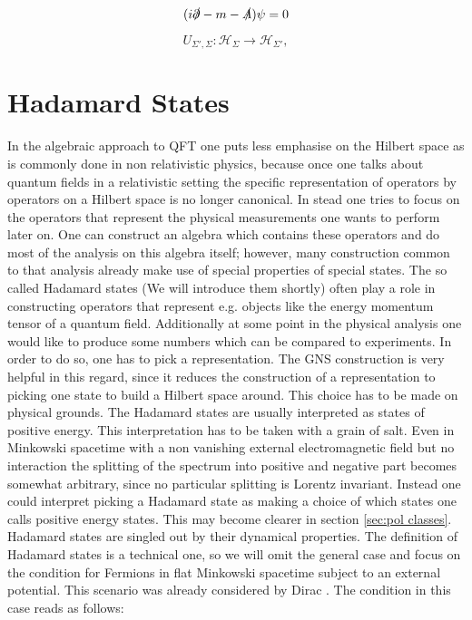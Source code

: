 \documentclass[a4paper,11pt]{article}
\begin{document}

\begin{equation}
(i\slashed{\partial} - m - \slashed{A})\psi = 0
\end{equation}

\begin{equation}
U_{\Sigma',\Sigma}:\mathcal{H}_\Sigma \rightarrow \mathcal{H}_{\Sigma'},
\end{equation}

\section{Hadamard States}
In the algebraic approach to QFT one puts less emphasise on the Hilbert space as is commonly done in non relativistic physics, because 
once one talks about quantum fields in a relativistic setting the specific representation of operators by operators on a Hilbert 
space is no longer canonical. 
In stead one tries to focus on the operators that represent the physical measurements one wants to perform later on. 
One can construct an algebra which contains these operators and do most of the analysis on this algebra itself; however, 
many construction common to that analysis already make use of special properties of special states. The so called Hadamard states 
(We will introduce them shortly) often play a role in constructing operators that represent e.g. objects like the energy 
momentum tensor of a quantum field. Additionally at some point in
the physical analysis one would like to produce some numbers which can be compared to experiments. In order to do so, one
has to pick a representation. The GNS construction is very helpful in this regard, since it reduces the construction of a representation to 
picking one state to build a Hilbert space around. This choice has to be made on physical grounds. 
The Hadamard states are usually interpreted as states of positive energy. This interpretation has to be taken with 
a grain of salt. Even in Minkowski spacetime with a non vanishing external electromagnetic field but no interaction the splitting of the
spectrum into positive and negative part becomes somewhat arbitrary, since no particular splitting is Lorentz invariant\cite{something!}.
Instead one could interpret picking a Hadamard state as making a choice of which states one
calls positive energy states. This may become clearer in section \ref{sec:pol classes}. 
Hadamard states are singled out by their dynamical properties. The definition of Hadamard states is a technical one, so we will omit
the general case and focus on the condition for Fermions in flat Minkowski spacetime subject to an external potential. This scenario was
already considered by Dirac \cite{Dirac34}. The condition in this case reads as follows: 
\end{document}
